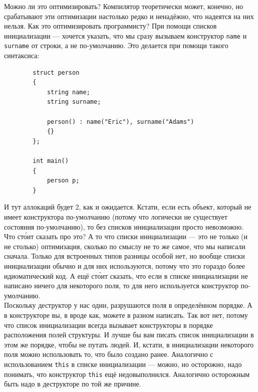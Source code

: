 \documentclass{article}
\begin{document}
    Можно ли это оптимизировать? Компилятор теоретически может, конечно, но срабатывают эти оптимизации настолько редко и ненадёжно, что надеятся на них нельзя. Как это оптимизировать программисту? При помощи списков инициализации --- хочется указать, что мы сразу вызываем конструктор \texttt{name} и \texttt{surname} от строки, а не по-умолчанию. Это делается при помощи такого синтаксиса:
    \begin{verbatim}
        struct person
        {
            string name;
            string surname;
            
            person() : name("Eric"), surname("Adams")
            {}
        };
        
        int main()
        {
            person p;
        }
    \end{verbatim}
    И тут аллокаций будет 2, как и ожидается. Кстати, если есть объект, который не имеет конструктора по-умолчанию (потому что логически не существует состояния по-умолчанию), то без списков инициализации просто невозможно.\\
    Что ст\'оит сказать про это? А то что списки инициализации --- это не только (и не столько) оптимизация, сколько по смыслу не то же самое, что мы написали сначала. Только для встроенных типов разницы особой нет, но вообще списки инициализации обычно и для них используются, потому что это гораздо более идиоматический код. А ещё ст\'оит сказать, что если в списке инициализации не написано ничего для некоторого поля, то для него используется конструктор по-умолчанию.\\
    Поскольку деструктор у нас один, разрушаются поля в определённом порядке. А в конструкторе вы, в вроде как, можете в разном написать. Так вот нет, потому что список инициализации всегда вызывает конструкторы в порядке расположения полей структуры. И лучше бы вам писать список инициализации в этом же порядке, чтобы не путать людей. И, кстати, в инициализации некоторого поля можно использовать то, что было создано ранее. Аналогично с использованием \texttt{this} в списке инициализации --- можно, но осторожно, надо понимать, что конструктор \texttt{this} ещё недовыполнился. Аналогично осторожным быть надо в деструкторе по той же причине.
\end{document}
